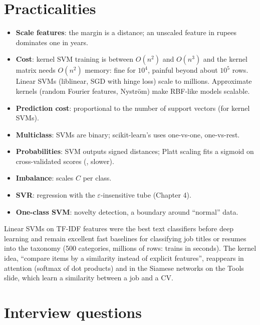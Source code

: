 \section{Practicalities}
\begin{itemize}
\item \textbf{Scale features}: the margin is a distance; an unscaled feature in rupees dominates one in years.
\item \textbf{Cost}: kernel SVM training is between $O(n^2)$ and $O(n^3)$ and the kernel matrix needs $O(n^2)$ memory: fine for
  $10^4$, painful beyond about $10^5$ rows. Linear SVMs (liblinear, SGD with hinge loss) scale to millions. Approximate kernels
  (random Fourier features, Nystr\"om) make RBF-like models scalable.
\item \textbf{Prediction cost}: proportional to the number of support vectors (for kernel SVMs).
\item \textbf{Multiclass}: SVMs are binary; scikit-learn's  uses one-vs-one,  one-vs-rest.
\item \textbf{Probabilities}: SVM outputs signed distances; Platt scaling fits a sigmoid on cross-validated scores
  (, slower).
\item \textbf{Imbalance}:  scales $C$ per class.
\item \textbf{SVR}: regression with the $\varepsilon$-insensitive tube (Chapter 4).
\item \textbf{One-class SVM}: novelty detection, a boundary around ``normal'' data.
\end{itemize}

\begin{practical}
Linear SVMs on TF-IDF features were the best text classifiers before deep learning and remain excellent fast baselines for
classifying job titles or resumes into the taxonomy (500 categories, millions of rows:  trains in seconds).
The kernel idea, ``compare items by a similarity instead of explicit features'', reappears in attention (softmax of dot
products) and in the Siamese networks on the Tools slide, which learn a similarity between a job and a CV.
\end{practical}

\section{Interview questions}

